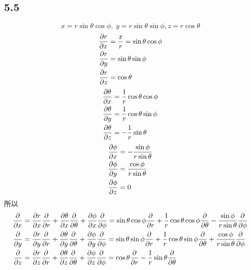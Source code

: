 \subsection{5.5}
\begin{equation}
x = r\sin\theta\cos\phi ,\; y = r\sin\theta\sin\phi, z = r\cos\theta
\end{equation}
\begin{align}
\pdv{r}{x} &= \dfrac{x}{r} = \sin\theta\cos\phi \\
\pdv{r}{y} &= \sin\theta\sin\phi \\
\pdv{r}{z} &= \cos\theta
\end{align}
\begin{align}
\pdv{\theta}{x} &= \dfrac{1}{r}\cos\theta\cos\phi \\
\pdv{\theta}{y} &= \dfrac{1}{r}\cos\theta\sin\phi \\
\pdv{\theta}{z} &= -\dfrac{1}{r}\sin\theta
\end{align}
\begin{align}
\pdv{\phi}{x} &= -\dfrac{\sin\phi}{r\sin\theta} \\
\pdv{\phi}{y} &= \dfrac{\cos\phi}{r\sin\theta} \\
\pdv{\phi}{z} &= 0
\end{align}
所以
\begin{align}
\pdv{x} &= \pdv{r}{x} \pdv{r} + \pdv{\theta}{x} \pdv{\theta} + \pdv{\phi}{x} \pdv{\phi} = \sin\theta\cos\phi \pdv{r} + \dfrac{1}{r}\cos\theta\cos\phi \pdv{\theta} -\dfrac{\sin\phi}{r\sin\theta} \pdv{\phi} \\
\pdv{y} &= \pdv{r}{y} \pdv{r} + \pdv{\theta}{y} \pdv{\theta} + \pdv{\phi}{y} \pdv{\phi} = \sin\theta\sin\phi \pdv{r} + \dfrac{1}{r}\cos\theta\sin\phi \pdv{\theta} +\dfrac{\cos\phi}{r\sin\theta} \pdv{\phi} \\
\pdv{z} &= \pdv{r}{z} \pdv{r} + \pdv{\theta}{z} \pdv{\theta} + \pdv{\phi}{z} \pdv{\phi} = \cos\theta \pdv{r} - \dfrac{1}{r}\sin\theta \pdv{\theta}
\end{align}
